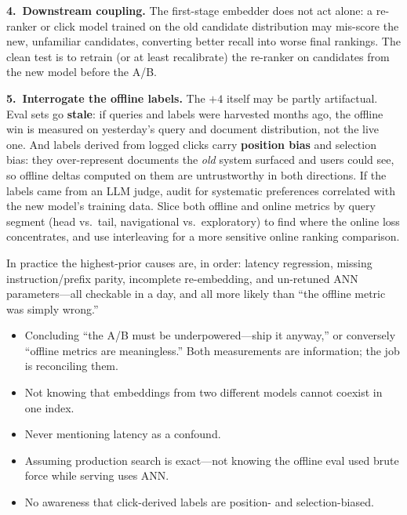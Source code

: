 \begin{interviewq}
\textbf{4.\ Downstream coupling.}  The first-stage embedder does not act
alone: a re-ranker or click model trained on the old candidate distribution
may mis-score the new, unfamiliar candidates, converting better recall into
worse final rankings.  The clean test is to retrain (or at least
recalibrate) the re-ranker on candidates from the new model before the A/B.

\textbf{5.\ Interrogate the offline labels.}  The $+4$ itself may be
partly artifactual.  Eval sets go \textbf{stale}: if queries and labels
were harvested months ago, the offline win is measured on yesterday's
query and document distribution, not the live one.  And labels derived
from logged clicks carry \textbf{position bias} and selection bias: they
over-represent documents the \emph{old} system surfaced and users could
see, so offline deltas computed on them are untrustworthy in both
directions.  If the labels came from an LLM judge, audit for systematic
preferences correlated with the new model's training data.  Slice both
offline and online metrics by query segment (head vs.\ tail, navigational
vs.\ exploratory) to find where the online loss concentrates, and use
interleaving for a more sensitive online ranking comparison.

In practice the highest-prior causes are, in order: latency regression,
missing instruction/prefix parity, incomplete re-embedding, and un-retuned
ANN parameters---all checkable in a day, and all more likely than ``the
offline metric was simply wrong.''

\redflags
\begin{itemize}
    \item Concluding ``the A/B must be underpowered---ship it anyway,''
    or conversely ``offline metrics are meaningless.''  Both measurements
    are information; the job is reconciling them.
    \item Not knowing that embeddings from two different models cannot
    coexist in one index.
    \item Never mentioning latency as a confound.
    \item Assuming production search is exact---not knowing the offline
    eval used brute force while serving uses ANN.
    \item No awareness that click-derived labels are position- and
    selection-biased.
\end{itemize}



\end{interviewq}
